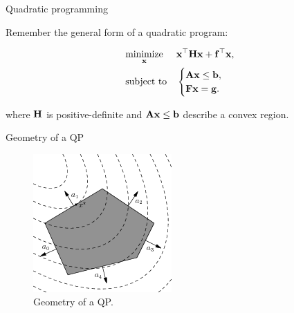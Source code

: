 \documentclass{beamer}
\begin{document}
\begin{frame}{Quadratic programming}
\begin{flushleft}

Remember the general form of a quadratic program:

%
\begin{equation}
	\begin{aligned}
		& \underset{\mathbf{x}}{\text{minimize}}
		& & \mathbf{x}^\top \mathbf{H} \mathbf{x} + \mathbf{f}^\top\mathbf{x}, \\
		& \text{subject to}
		& & \begin{cases}
			\mathbf{A}\mathbf{x} \leq \mathbf{b}, \\
			\mathbf{F}\mathbf{x} = \mathbf{g}.
		\end{cases}
	\end{aligned}
\end{equation}

where $\mathbf{H}$ is positive-definite and $\mathbf{A}\mathbf{x} \leq \mathbf{b}$ describe a convex region.
 
\end{flushleft}
\end{frame}



\begin{frame}{Geometry of a QP}
	\begin{flushleft}
		
		\begin{figure}
			\centering
			\includegraphics[width=0.5\linewidth]{qpcontour}
			\caption{Geometry of a QP. }
			\label{fig:qpcontour}
		\end{figure}
		
		
	\end{flushleft}
\end{frame}
\end{document}
